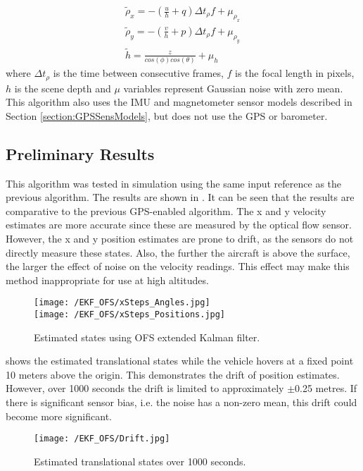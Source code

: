 \begin{equation}\label{eqn:OFS}
\begin{split}
\tilde{\rho}_{x}=-\left(\frac{u}{h}+q\right)\Delta t_{\rho}f+\mu_{\rho_{x}}\\
\tilde{\rho}_{y}=-\left(\frac{v}{h}+p\right)\Delta t_{\rho}f+\mu_{\rho_{y}}\\
\tilde{h}=\frac{z}{cos(\phi)cos(\theta)}+\mu_{h}
\end{split}
\end{equation}
where $\Delta t_{\rho}$ is the time between consecutive frames, $f$ is the focal length in pixels, $h$ is the scene depth and $\mu$ variables represent Gaussian noise with zero mean.\\
This algorithm also uses the IMU and magnetometer sensor models described in Section \ref{section:GPSSensModels}, but does not use the GPS or barometer.

\subsection{Preliminary Results}

This algorithm was tested in simulation using the same input reference as the previous algorithm. The results are shown in . It can be seen that the results are comparative to the previous GPS-enabled algorithm. The x and y velocity estimates are more accurate since these are measured by the optical flow sensor. However, the x and y position estimates are prone to drift, as the sensors do not directly measure these states. Also, the further the aircraft is above the surface, the larger the effect of noise on the velocity readings. This effect may make this method inappropriate for use at high altitudes. 

\begin{figure}[htb]
\begin{center}
	\texttt{[image: /EKF\_OFS/xSteps\_Angles.jpg]}\\
	\texttt{[image: /EKF\_OFS/xSteps\_Positions.jpg]}
	\end{center}
	\caption{Estimated states using OFS extended Kalman filter.}%
	\label{fig:EKF_OFS_Results}%
\end{figure}

 shows the estimated translational states while the vehicle hovers at a fixed point 10 meters above the origin. This demonstrates the drift of position estimates. However, over 1000 seconds the drift is limited to approximately $\pm$0.25 metres. If there is significant sensor bias, i.e. the noise has a non-zero mean, this drift could become more significant.
\begin{figure}[htb]
\begin{center}
	\texttt{[image: /EKF\_OFS/Drift.jpg]}\\
	\end{center}
	\caption{Estimated translational states over 1000 seconds.}%
	\label{fig:EKF_OFS_Drift}%
\end{figure}

